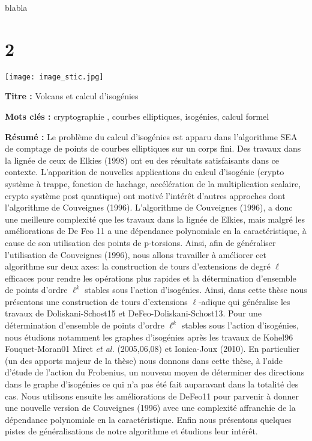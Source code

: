 \documentclass[a4paper, titlepage, 12pt]{book}
\makeatletter
\newcommand*{\cleartoleftpage}{%
  \clearpage
    \if@twoside
    \ifodd\c@page
      \hbox{}\newpage
      \if@twocolumn
        \hbox{}\newpage
      \fi
    \fi
  \fi
}
\newcommand{\titre}{Volcans et calcul d'isogénies}
\makeatother
\begin{document}
blabla

\chapter{2}



\cleartoleftpage
\pagestyle{empty}
\texttt{[image: image\_stic.jpg]}

\vspace{1ex}

\begin{breakbox}

\noindent\textbf{Titre : }\titre

\vspace{2ex}

\noindent\textbf{Mots clés : }cryptographie , courbes elliptiques, isogénies, 
calcul formel

\begin{multicols}{2}
\noindent\textbf{Résumé : }
Le problème du calcul d'isogénies est apparu dans l'algorithme SEA de comptage
de points de courbes elliptiques sur un corps fini. Des travaux dans la lignée de ceux de 
Elkies (1998) ont eu des résultats satisfaisants dans ce contexte. L'apparition de nouvelles applications du calcul d'isogénie (crypto système à trappe, fonction de hachage, accélération de la multiplication scalaire, crypto système post quantique) ont motivé l’intérêt d'autres approches dont l'algorithme de Couveignes (1996).  L'algorithme de Couveignes (1996), a donc une meilleure complexité que les travaux dans la lignée de Elkies, mais malgré les améliorations de De Feo 11 a une dépendance polynomiale en la caractéristique, à cause de son utilisation des points de p-torsions. Ainsi, afin de généraliser l'utilisation de Couveignes (1996), nous allons travailler à améliorer cet algorithme sur deux axes: la construction de tours d'extensions de degré $\ell$ efficaces pour rendre les opérations plus rapides et la détermination d'ensemble de points d'ordre $\ell^k$ stables sous l'action d'isogénies. Ainsi, dans cette thèse nous présentons une construction de tours d'extensions $\ell$-adique qui généralise les travaux de Doliskani-Schost15 et DeFeo-Doliskani-Schost13. Pour une détermination d'ensemble de points d'ordre $\ell^k$ stables sous l'action d'isogénies, nous étudions notamment les graphes d'isogénies après les travaux de Kohel96 Fouquet-Moran01 Miret \emph{et al.} (2005,06,08) et Ionica-Joux (2010). En particulier (un des apports majeur de la thèse) nous donnons dans cette thèse, à l'aide d'étude de l'action du Frobenius, un nouveau moyen de déterminer des directions dans le graphe d'isogénies ce qui n'a pas été fait auparavant dans la totalité des cas. Nous utilisons ensuite les améliorations de DeFeo11 pour parvenir à donner une nouvelle version de Couveignes (1996) avec une complexité affranchie de la dépendance polynomiale en la caractéristique. Enfin nous présentons quelques pistes de généralisations de notre algorithme et étudions leur intérêt.
\end{multicols}
\end{breakbox}
\end{document}
